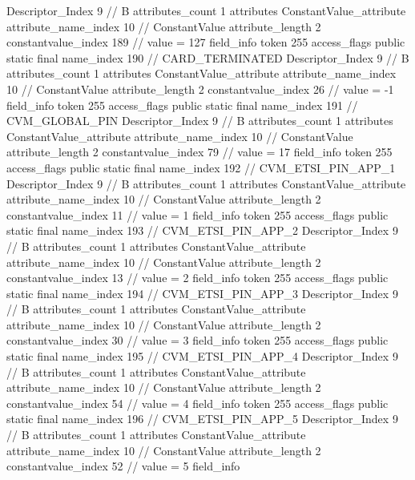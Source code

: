 {{{{{				Descriptor_Index	9		// B
				attributes_count	1
				attributes {
				ConstantValue_attribute {
					attribute_name_index	10		// ConstantValue
					attribute_length	2
					constantvalue_index	189		// value = 127
				}
				}
			}
			field_info {
				token	255
				access_flags	public static final
				name_index	190		// CARD_TERMINATED
				Descriptor_Index	9		// B
				attributes_count	1
				attributes {
				ConstantValue_attribute {
					attribute_name_index	10		// ConstantValue
					attribute_length	2
					constantvalue_index	26		// value = -1
				}
				}
			}
			field_info {
				token	255
				access_flags	public static final
				name_index	191		// CVM_GLOBAL_PIN
				Descriptor_Index	9		// B
				attributes_count	1
				attributes {
				ConstantValue_attribute {
					attribute_name_index	10		// ConstantValue
					attribute_length	2
					constantvalue_index	79		// value = 17
				}
				}
			}
			field_info {
				token	255
				access_flags	public static final
				name_index	192		// CVM_ETSI_PIN_APP_1
				Descriptor_Index	9		// B
				attributes_count	1
				attributes {
				ConstantValue_attribute {
					attribute_name_index	10		// ConstantValue
					attribute_length	2
					constantvalue_index	11		// value = 1
				}
				}
			}
			field_info {
				token	255
				access_flags	public static final
				name_index	193		// CVM_ETSI_PIN_APP_2
				Descriptor_Index	9		// B
				attributes_count	1
				attributes {
				ConstantValue_attribute {
					attribute_name_index	10		// ConstantValue
					attribute_length	2
					constantvalue_index	13		// value = 2
				}
				}
			}
			field_info {
				token	255
				access_flags	public static final
				name_index	194		// CVM_ETSI_PIN_APP_3
				Descriptor_Index	9		// B
				attributes_count	1
				attributes {
				ConstantValue_attribute {
					attribute_name_index	10		// ConstantValue
					attribute_length	2
					constantvalue_index	30		// value = 3
				}
				}
			}
			field_info {
				token	255
				access_flags	public static final
				name_index	195		// CVM_ETSI_PIN_APP_4
				Descriptor_Index	9		// B
				attributes_count	1
				attributes {
				ConstantValue_attribute {
					attribute_name_index	10		// ConstantValue
					attribute_length	2
					constantvalue_index	54		// value = 4
				}
				}
			}
			field_info {
				token	255
				access_flags	public static final
				name_index	196		// CVM_ETSI_PIN_APP_5
				Descriptor_Index	9		// B
				attributes_count	1
				attributes {
				ConstantValue_attribute {
					attribute_name_index	10		// ConstantValue
					attribute_length	2
					constantvalue_index	52		// value = 5
				}
				}
			}
			field_info {
}}}}}
